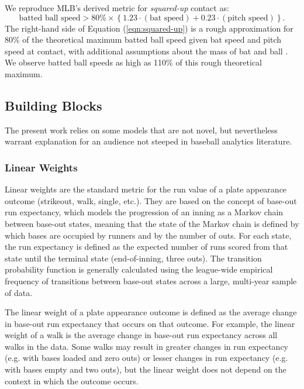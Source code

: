 \documentclass[
  12pt]{article}
\begin{document}
    We reproduce MLB's derived metric for {\it squared-up} contact as:
    \begin{equation}
        \label{eqn:squared-up}
    \mbox{batted ball speed} > 80\% \times \left\{1.23 \cdot (\mbox{bat speed}) + 0.23 \cdot (\mbox{pitch speed})\right\}.
    \end{equation}
    The right-hand side of Equation (\ref{eqn:squared-up}) is a rough approximation for 80\% of the theoretical maximum batted ball speed given bat speed and pitch speed at contact, with additional assumptions about the mass of bat and ball \citep{nathan_dynamics_2000}. We observe batted ball speeds as high as 110\% of this rough theoretical maximum.

    \subsection{Building Blocks}

      The present work relies on some models that are not novel, but nevertheless warrant explanation for an audience not steeped in baseball analytics literature.
    
      \subsubsection{Linear Weights}
      \label{sec:linear-weights}

        Linear weights \citep{thorn_hidden_1984} are the standard metric for the run value of a plate appearance outcome (strikeout, walk, single, etc.). They are based on the concept of base-out run expectancy, which models the progression of an inning as a Markov chain between base-out states, meaning that the state of the Markov chain is defined by which bases are occupied by runners and by the number of outs. For each state, the run expectancy is defined as the expected number of runs scored from that state until the terminal state (end-of-inning, three outs). The transition probability function is generally calculated using the league-wide empirical frequency of transitions between base-out states across a large, multi-year sample of data.

        The linear weight of a plate appearance outcome is defined as the average change in base-out run expectancy that occurs on that outcome. For example, the linear weight of a walk is the average change in base-out run expectancy across all walks in the data. Some walks may result in greater changes in run expectancy (e.g. with bases loaded and zero outs) or lesser changes in run expectancy (e.g. with bases empty and two outs), but the linear weight does not depend on the context in which the outcome occurs.
\end{document}
